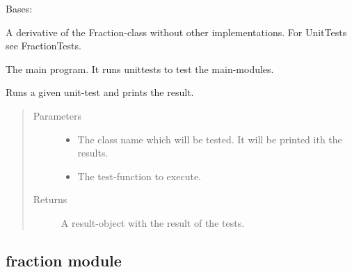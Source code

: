 \documentclass[letterpaper,10pt,english]{sphinxmanual}
\begin{document}
\begin{fulllineitems}
\label{\detokenize{bruch:bruch.Bruch}}
Bases: {\hyperref[\detokenize{fraction:fraction.Fraction}]{}}

A derivative of the Fraction-class without other implementations.
For UnitTests see FractionTests.

\end{fulllineitems}


\begin{fulllineitems}
\label{\detokenize{bruch:bruch.main}}
The main program. It runs unittests to test the main-modules.

\end{fulllineitems}


\begin{fulllineitems}
\label{\detokenize{bruch:bruch.run_test}}
Runs a given unit-test and prints the result.
\begin{quote}\begin{description}
\item[{Parameters}] \leavevmode\begin{itemize}
\item {} 
 \textendash{} The class name which will be tested. It will be printed ith the results.

\item {} 
 \textendash{} The test-function to execute.

\end{itemize}

\item[{Returns}] \leavevmode
A result-object with the result of the tests.

\end{description}\end{quote}

\end{fulllineitems}



\subsection{fraction module}
\label{\detokenize{fraction:fraction-module}}\label{\detokenize{fraction::doc}}
\end{document}
